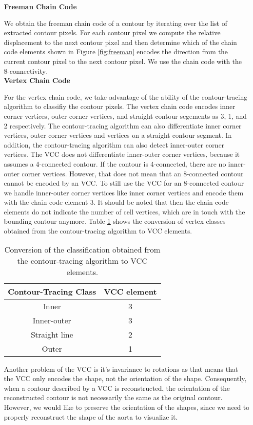 \documentclass[thesis.tex]{subfiles}
\begin{document}
\textbf{Freeman Chain Code}

We obtain the freeman chain code of a contour by iterating over the list of extracted contour pixels. For each contour pixel we compute the relative displacement to the next contour pixel and then determine which of the chain code elements shown in Figure \ref{fig:freeman} encodes the direction from the current contour pixel to the next contour pixel. We use the chain code with the 8-connectivity. \\

\textbf{Vertex Chain Code}

For the vertex chain code, we take advantage of the ability of the contour-tracing algorithm to classifiy the contour pixels. The vertex chain code encodes inner corner vertices, outer corner vertices, and straight contour segements as 3, 1, and 2 respectively. The contour-tracing algorithm can also differentiate inner corner vertices, outer corner vertices and vertices on a straight contour segment. In addition, the contour-tracing algorithm can also detect inner-outer corner vertices. The VCC does not differentiate inner-outer corner vertices, because it assumes a 4-connected contour. If the contour is 4-connected, there are no inner-outer corner vertices. However, that does not mean that an 8-connected contour cannot be encoded by an VCC. To still use the VCC for an 8-connected contour we handle inner-outer corner vertices like inner corner vertices and encode them with the chain code element 3. It should be noted that then the chain code elements do not indicate the number of cell vertices, which are in touch with the bounding contour anymore. Table \ref{vcc_table}  shows the conversion of vertex classes obtained from the contour-tracing algorithm to VCC elements. 
\begin{table}[h!]
\centering
 \begin{tabular}{c c} 
 \toprule
 Contour-Tracing Class &  VCC element\\ [0.5ex] 
 \midrule
 Inner & 3 \\ 
 Inner-outer & 3 \\
 Straight line & 2 \\
 Outer & 1 \\
\bottomrule
\end{tabular}
\caption{Conversion of the classification obtained from the contour-tracing algorithm to VCC elements.}
\label{vcc_table}
\end{table}
 
Another problem of the VCC is it's invariance to rotations as that means that the VCC only encodes the shape, not the orientation of the shape. Consequently, when a contour described by a VCC is reconstructed, the orientation of the reconstructed contour is not necessarily the same as the original contour. However, we would like to preserve the orientation of the shapes, since we need to properly reconstruct the shape of the aorta to visualize it.
\end{document}
